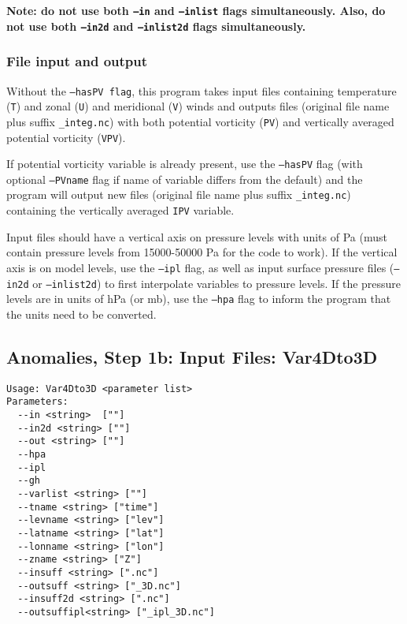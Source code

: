 \documentclass{article}
\begin{document}
\textbf{Note: do not use both \texttt{--in} and \texttt{--inlist} flags simultaneously. Also, do not use both \texttt{--in2d} and \texttt{--inlist2d} flags simultaneously.}

\subsubsection{File input and output}


Without the \texttt{--hasPV flag}, this program takes input files containing temperature (\texttt{T}) and zonal (\texttt{U}) and meridional (\texttt{V}) winds and outputs files  (original file name plus suffix \texttt{\_integ.nc}) with both potential vorticity (\texttt{PV}) and vertically averaged potential vorticity (\texttt{VPV}). 


If potential vorticity variable is already present,  use the \texttt{--hasPV} flag (with optional \texttt{--PVname} flag if name of variable differs from the default) and the program will output new files (original file name plus suffix \texttt{\_integ.nc}) containing the vertically averaged \texttt{IPV} variable.

Input files should have a vertical axis on pressure levels with units of Pa (must contain pressure levels from 15000-50000 Pa for the code to work). If the vertical axis is on model levels, use the \texttt{--ipl} flag, as well as input surface pressure files (\texttt{--in2d} or \texttt{--inlist2d}) to first interpolate variables to pressure levels. If the pressure levels are in units of hPa (or mb), use the \texttt{--hpa} flag to inform the program that the units need to be converted.

\subsection{Anomalies, Step 1b: Input Files: Var4Dto3D}\label{4D}
\begin{verbatim}
Usage: Var4Dto3D <parameter list>
Parameters:
  --in <string>  [""]
  --in2d <string> [""]
  --out <string> [""]
  --hpa
  --ipl
  --gh
  --varlist <string> [""]
  --tname <string> ["time"]
  --levname <string> ["lev"]
  --latname <string> ["lat"]
  --lonname <string> ["lon"]
  --zname <string> ["Z"]
  --insuff <string> [".nc"]
  --outsuff <string> ["_3D.nc"]
  --insuff2d <string> [".nc"]
  --outsuffipl<string> ["_ipl_3D.nc"]
\end{verbatim}
\end{document}
